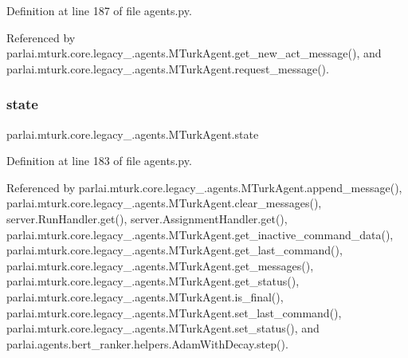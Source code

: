 Definition at line 187 of file agents.\+py.



Referenced by parlai.\+mturk.\+core.\+legacy\+\_.\+agents.\+M\+Turk\+Agent.\+get\+\_\+new\+\_\+act\+\_\+message(), and parlai.\+mturk.\+core.\+legacy\+\_.\+agents.\+M\+Turk\+Agent.\+request\+\_\+message().

\mbox{\label{classparlai_1_1mturk_1_1core_1_1legacy__2018_1_1agents_1_1MTurkAgent_abd506583831f05a09f1c02f5182996a6}} 
\subsubsection{\texorpdfstring{state}{state}}
{\footnotesize\ttfamily parlai.\+mturk.\+core.\+legacy\+\_.\+agents.\+M\+Turk\+Agent.\+state}



Definition at line 183 of file agents.\+py.



Referenced by parlai.\+mturk.\+core.\+legacy\+\_.\+agents.\+M\+Turk\+Agent.\+append\+\_\+message(), parlai.\+mturk.\+core.\+legacy\+\_.\+agents.\+M\+Turk\+Agent.\+clear\+\_\+messages(), server.\+Run\+Handler.\+get(), server.\+Assignment\+Handler.\+get(), parlai.\+mturk.\+core.\+legacy\+\_.\+agents.\+M\+Turk\+Agent.\+get\+\_\+inactive\+\_\+command\+\_\+data(), parlai.\+mturk.\+core.\+legacy\+\_.\+agents.\+M\+Turk\+Agent.\+get\+\_\+last\+\_\+command(), parlai.\+mturk.\+core.\+legacy\+\_.\+agents.\+M\+Turk\+Agent.\+get\+\_\+messages(), parlai.\+mturk.\+core.\+legacy\+\_.\+agents.\+M\+Turk\+Agent.\+get\+\_\+status(), parlai.\+mturk.\+core.\+legacy\+\_.\+agents.\+M\+Turk\+Agent.\+is\+\_\+final(), parlai.\+mturk.\+core.\+legacy\+\_.\+agents.\+M\+Turk\+Agent.\+set\+\_\+last\+\_\+command(), parlai.\+mturk.\+core.\+legacy\+\_.\+agents.\+M\+Turk\+Agent.\+set\+\_\+status(), and parlai.\+agents.\+bert\+\_\+ranker.\+helpers.\+Adam\+With\+Decay.\+step().

\mbox{\label{classparlai_1_1mturk_1_1core_1_1legacy__2018_1_1agents_1_1MTurkAgent_afe5fa534a3c02aedd98e5dc61a8fbe7c}} 
